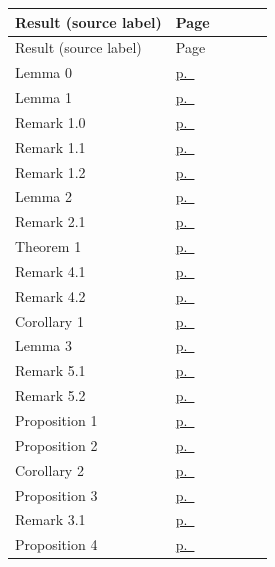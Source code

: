 \begin{center}\footnotesize
\begin{longtable}{@{}L{0.62\linewidth}l@{}}
\toprule Result (source label) & Page \\ \midrule\endfirsthead
\toprule Result (source label) & Page \\ \midrule\endhead
Lemma 0 & \hyperref[pB-res-lemma-0]{p.~\pageref{pB-res-lemma-0}} \\
Lemma 1 & \hyperref[pB-res-lemma-1]{p.~\pageref{pB-res-lemma-1}} \\
Remark 1.0 & \hyperref[pB-res-remark-1.0]{p.~\pageref{pB-res-remark-1.0}} \\
Remark 1.1 & \hyperref[pB-res-remark-1.1]{p.~\pageref{pB-res-remark-1.1}} \\
Remark 1.2 & \hyperref[pB-res-remark-1.2]{p.~\pageref{pB-res-remark-1.2}} \\
Lemma 2 & \hyperref[pB-res-lemma-2]{p.~\pageref{pB-res-lemma-2}} \\
Remark 2.1 & \hyperref[pB-res-remark-2.1]{p.~\pageref{pB-res-remark-2.1}} \\
Theorem 1 & \hyperref[pB-res-theorem-1]{p.~\pageref{pB-res-theorem-1}} \\
Remark 4.1 & \hyperref[pB-res-remark-4.1]{p.~\pageref{pB-res-remark-4.1}} \\
Remark 4.2 & \hyperref[pB-res-remark-4.2]{p.~\pageref{pB-res-remark-4.2}} \\
Corollary 1 & \hyperref[pB-res-corollary-1]{p.~\pageref{pB-res-corollary-1}} \\
Lemma 3 & \hyperref[pB-res-lemma-3]{p.~\pageref{pB-res-lemma-3}} \\
Remark 5.1 & \hyperref[pB-res-remark-5.1]{p.~\pageref{pB-res-remark-5.1}} \\
Remark 5.2 & \hyperref[pB-res-remark-5.2]{p.~\pageref{pB-res-remark-5.2}} \\
Proposition 1 & \hyperref[pB-res-proposition-1]{p.~\pageref{pB-res-proposition-1}} \\
Proposition 2 & \hyperref[pB-res-proposition-2]{p.~\pageref{pB-res-proposition-2}} \\
Corollary 2 & \hyperref[pB-res-corollary-2]{p.~\pageref{pB-res-corollary-2}} \\
Proposition 3 & \hyperref[pB-res-proposition-3]{p.~\pageref{pB-res-proposition-3}} \\
Remark 3.1 & \hyperref[pB-res-remark-3.1]{p.~\pageref{pB-res-remark-3.1}} \\
Proposition 4 & \hyperref[pB-res-proposition-4]{p.~\pageref{pB-res-proposition-4}} \\

\end{longtable}
\end{center}
